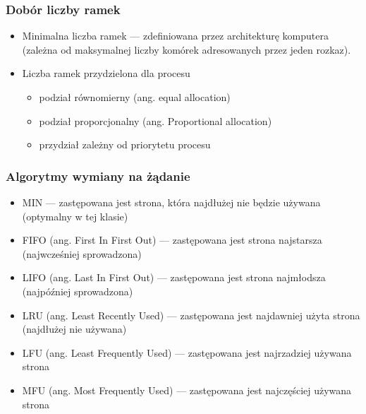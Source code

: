 \documentclass[main.tex]{subfiles}
\begin{document}
    \subsubsection{Dobór liczby ramek}
    \begin{itemize}
        \item Minimalna liczba ramek — zdefiniowana przez architekturę komputera (zależna od maksymalnej liczby komórek adresowanych
        przez jeden rozkaz).
        \item Liczba ramek przydzielona dla procesu
        \begin{itemize}
            \item podział równomierny (ang. equal allocation)
            \item podział proporcjonalny (ang. Proportional allocation)
            \item przydział zależny od priorytetu procesu
        \end{itemize}
    \end{itemize}

    \subsubsection{Algorytmy wymiany na żądanie}
    \begin{itemize}
        \item MIN — zastępowana jest strona, która najdłużej nie będzie używana (optymalny w tej klasie)
        \item FIFO (ang. First In First Out) — zastępowana jest strona najstarsza (najwcześniej sprowadzona)
        \item LIFO (ang. Last In First Out) — zastępowana jest strona najmłodsza (najpóźniej sprowadzona)
        \item LRU (ang. Least Recently Used) — zastępowana jest najdawniej użyta strona (najdłużej nie używana)
        \item LFU (ang. Least Frequently Used) — zastępowana jest najrzadziej używana strona
        \item MFU (ang. Most Frequently Used) — zastępowana jest najczęściej używana strona
    \end{itemize}
\end{document}
